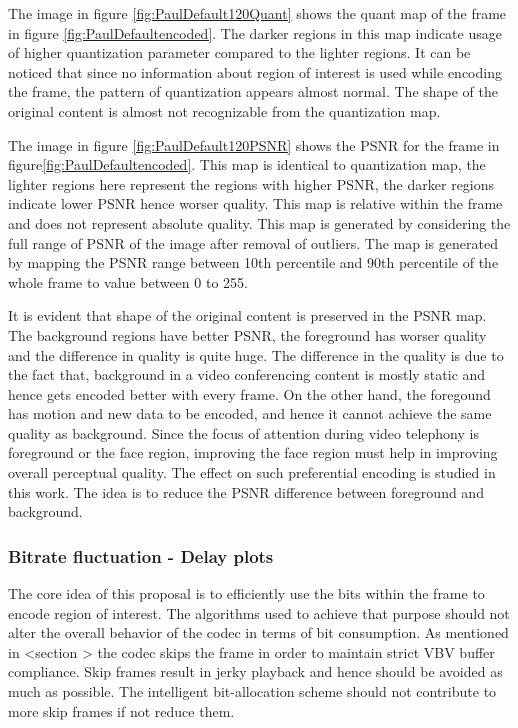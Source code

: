 \documentclass[11pt]{article} %
\begin{document}
The image in figure \ref{fig:PaulDefault120Quant} shows the quant map of the frame in figure \ref{fig:PaulDefaultencoded}. The darker regions in this map indicate usage of higher quantization parameter compared to the lighter regions. It can be noticed that since no information about region of interest is used while encoding the frame, the pattern of quantization appears almost normal. The shape of the original content is almost not recognizable from the quantization map.

The image in figure \ref{fig:PaulDefault120PSNR} shows the PSNR for the frame in figure\ref{fig:PaulDefaultencoded}. This map is identical to quantization map, the lighter regions here represent the regions with higher PSNR, the darker regions indicate lower PSNR hence worser quality. This map is relative within the frame and does not represent  absolute quality. This map is generated by considering the full range of PSNR of the image after removal of outliers. The map is generated by mapping the PSNR range between 10th percentile and 90th percentile of the whole frame to value between 0 to 255. 

It is evident that shape of the original content is preserved in the PSNR map. The background regions have better PSNR, the foreground has worser quality and the difference in quality is quite huge. The difference in the quality is due to the fact that, background in a video conferencing content is mostly static and hence gets encoded better with every frame. On the other hand, the foregound has motion and new data to be encoded, and hence it cannot achieve the same quality as background. Since the focus of attention during video telephony is foreground or the face region, improving the face region must help in improving overall perceptual quality. The effect on such preferential encoding is studied in this work. The idea is to reduce the PSNR difference between foreground and background. 
\subsubsection{Bitrate fluctuation - Delay plots}
The core idea of this proposal is to efficiently use the bits within the frame to encode region of interest. The algorithms used to achieve that purpose should not alter the overall behavior of the codec in terms of bit consumption. As mentioned in <section > the codec skips the frame in order to maintain strict VBV buffer compliance. Skip frames result in jerky playback and hence should be avoided as much as possible. The intelligent bit-allocation scheme should not contribute to more skip frames if not reduce them.
\end{document}
